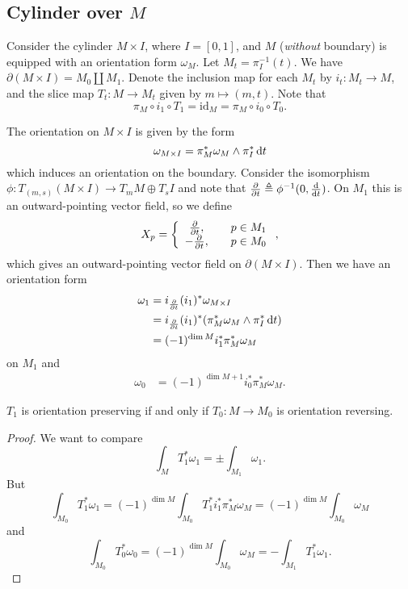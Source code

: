 \subsection{Cylinder over $M$}
Consider the cylinder $M \times I$, where $I = [0, 1]$, and
$M$ (\emph{without} boundary) is equipped with an orientation form
$\omega_M$. Let
$M_t = \pi_I^{-1}(t)$. We have
$\partial(M \times I) = M_0 \coprod M_1$. Denote the inclusion map for
each $M_t$ by $i_t: M_t \to M$, and the slice map $T_t : M \to M_t$
given by $m \mapsto (m, t)$. Note that
$$
  \pi_M \circ i_1 \circ T_1
= \mathrm{id}_M
= \pi_M \circ i_0 \circ T_0.
$$

The orientation on $M \times I$ is given by the form
$$
  \omega_{M \times I}
= \pi_M^\ast \omega_M \wedge \pi_I^\ast \mathop{}\!\mathrm{d} t
$$
which induces an orientation on the boundary.
Consider the isomorphism
$\phi: T_{(m, s)} (M \times I) \to T_m M \oplus T_s I$ and note that
$\frac{\partial}{\partial t} \triangleq \phi^{-1}(0, \frac{\mathop{}\!\mathrm{d}}{\mathop{}\!\mathrm{d}
  t})$.
On $M_1$ this is an outward-pointing vector field, so we define
$$
  X_p
= \left\{
    \begin{array}{c c}
      \frac{\partial}{\partial t}, & \quad p \in M_1 \\
     -\frac{\partial}{\partial t}, & \quad p \in M_0 \\
    \end{array}
  \right.,
$$
which gives an outward-pointing vector field on $\partial(M \times
I)$.
Then we have an orientation form
\begin{align*}
   \omega_1
&= i_{\frac{\partial}{\partial t}} (i_1)^\ast \omega_{M \times I} \\
&= i_{\frac{\partial}{\partial t}} (i_1)^\ast(\pi_M^\ast \omega_M
\wedge \pi_I^\ast \mathop{}\!\mathrm{d} t) \\
&= (-1)^{\dim M} i_1^\ast \pi_M^\ast \omega_M
\end{align*}
on $M_1$ and
\begin{align*}
   \omega_0
&= (-1)^{\dim M + 1} i_0^\ast \pi_M^\ast \omega_M.
\end{align*}

\begin{lemma}
$T_1$ is orientation preserving if and only if $T_0 : M \to M_0$ is
orientation reversing.
\end{lemma}
\begin{proof}
We want to compare
$$
  \int_M T_1^\ast \omega_1
= \pm \int_{M_1} \omega_1.
$$
But
$$
  \int_{M_0} T_1^\ast \omega_1
= (-1)^{\dim M}\int_{M_0} T_1^\ast i_1^\ast \pi_M^\ast \omega_M
= (-1)^{\dim M}\int_{M_0} \omega_M
$$
and
$$
  \int_{M_0} T_0^\ast \omega_0
= (-1)^{\dim M} \int_{M_0} \omega_M
= -\int_{M_1} T_1^\ast \omega_1.
$$
\end{proof}

